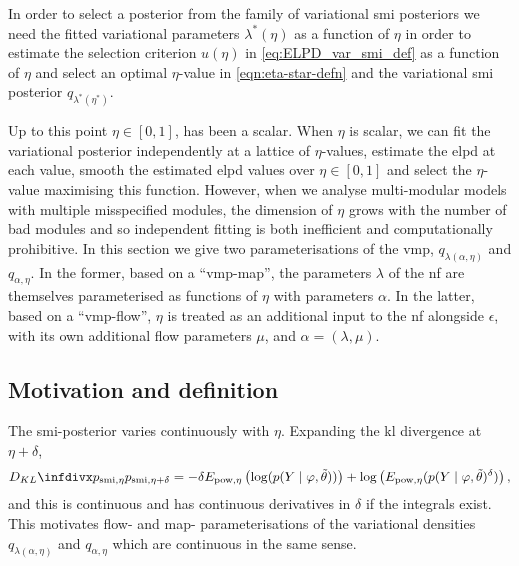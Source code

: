 In order to select a posterior from the family of variational \acrshort*{smi} posteriors we need the fitted variational parameters $\lambda^*(\eta)$ as a function of $\eta$ in order to estimate the selection criterion $u(\eta)$ in \cref{eq:ELPD_var_smi_def} as a function of $\eta$ and select an optimal $\eta$-value in \cref{eqn:eta-star-defn} and the variational \acrshort*{smi} posterior $q_{\lambda^*(\eta^*)}$.

Up to this point $\eta\in [0,1]$, has been a scalar.
When $\eta$ is scalar, we can fit the variational posterior independently at a lattice of $\eta$-values, estimate the \acrshort*{elpd} at each value, smooth the estimated \acrshort*{elpd} values over $\eta\in [0,1]$ and select the $\eta$-value maximising this function.
However, when we analyse multi-modular models with multiple misspecified modules, the dimension of $\eta$ grows with the number of bad modules and so independent fitting is both inefficient and computationally prohibitive.
In this section we give two parameterisations of the \acrfull*{vmp}, $q_{\lambda(\alpha,\eta)}$ and $q_{\alpha,\eta}$. In the former, based on a ``\acrshort*{vmp}-map'', the parameters $\lambda$ of the \acrshort*{nf} are themselves parameterised as functions of $\eta$ with parameters $\alpha$. In the latter, based on a ``\acrshort*{vmp}-flow'', $\eta$ is treated as an additional input to the \acrshort*{nf} alongside $\epsilon$, with its own additional flow parameters $\mu$, and $\alpha=(\lambda,\mu)$. %

\subsection{Motivation and definition}

The \acrshort*{smi}-posterior varies continuously with $\eta$.
Expanding the \acrshort*{kl} divergence at $\eta+\delta$,
\[
  \kl{p_{\smi,\eta}}{p_{\smi,\eta+\delta}}=-\delta E_{\pow, \eta}\left(\log(p(Y \mid \varphi,\tilde\theta))\right)+\log\left(E_{\pow, \eta}(p(Y \mid \varphi,\tilde\theta)^{\delta})\right),
\]
and this is continuous and has continuous derivatives in $\delta$ if the integrals exist. This motivates flow- and map- parameterisations of the variational densities $q_{\lambda(\alpha,\eta)}$ and $q_{\alpha,\eta}$ which are continuous in the same sense.

